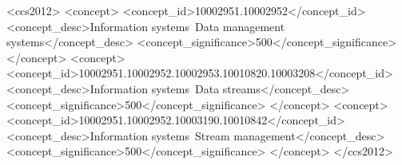 \documentclass[acmsmall]{acmart}
\begin{document}
\begin{CCSXML}
<ccs2012>
   <concept>
       <concept_id>10002951.10002952</concept_id>
       <concept_desc>Information systems~Data management systems</concept_desc>
       <concept_significance>500</concept_significance>
       </concept>
   <concept>
       <concept_id>10002951.10002952.10002953.10010820.10003208</concept_id>
       <concept_desc>Information systems~Data streams</concept_desc>
       <concept_significance>500</concept_significance>
       </concept>
   <concept>
       <concept_id>10002951.10002952.10003190.10010842</concept_id>
       <concept_desc>Information systems~Stream management</concept_desc>
       <concept_significance>500</concept_significance>
       </concept>
 </ccs2012>
\end{CCSXML}










%
\end{document}
